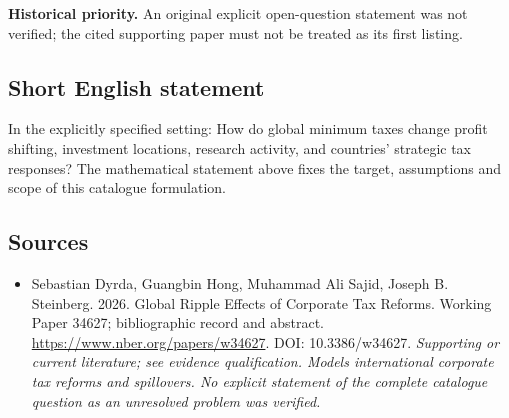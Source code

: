 \documentclass[11pt]{article}
\begin{document}
\par\textbf{Historical priority.} An original explicit open-question statement was not verified; the cited supporting paper must not be treated as its first listing.

\subsection{Short English statement}
In the explicitly specified setting: How do global minimum taxes change profit shifting, investment locations, research activity, and countries' strategic tax responses? The mathematical statement above fixes the target, assumptions and scope of this catalogue formulation.

\subsection{Sources}
\begin{itemize}\raggedright
\item[\textnormal{[S1]}]\hypertarget{source:30007757:1}{} Sebastian Dyrda, Guangbin Hong, Muhammad Ali Sajid, Joseph B. Steinberg. 2026. Global Ripple Effects of Corporate Tax Reforms. Working Paper 34627; bibliographic record and abstract.
\url{https://www.nber.org/papers/w34627}.
DOI: 10.3386/w34627.
{\small\textit{Supporting or current literature; see evidence qualification. Models international corporate tax reforms and spillovers. No explicit statement of the complete catalogue question as an unresolved problem was verified.}}
\end{itemize}
\end{document}
